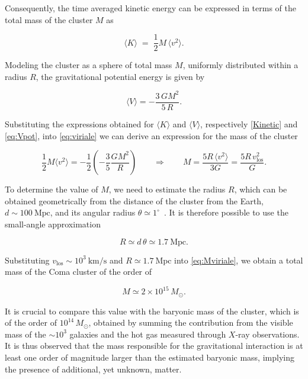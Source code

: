 Consequently, the time averaged kinetic energy can be expressed in terms of the total mass of the cluster $M$ as

\begin{equation} \label{Kinetic}
\langle K\rangle \;=\;\frac{1}{2}M\,\langle v^{2}\rangle.
\end{equation}

Modeling the cluster as a sphere of total mass $M$, uniformly distributed within a radius $R$, the gravitational potential energy is given by

\begin{equation}\label{eq:Vpot}
    \langle V\rangle = -\frac{3\,G M^{2}}{5\,R}.
\end{equation}

Substituting the expressions obtained for $\langle K \rangle$ and $\langle V \rangle$, respectively \cref{Kinetic} and \cref{eq:Vpot}, into \cref{eq:viriale} we can derive an expression for the mass of the cluster

\begin{equation}
\frac{1}{2}M\langle v^{2}\rangle
=
-\frac{1}{2}\!\left(-\frac{3}{5}\frac{GM^{2}}{R}\right)
\qquad\Rightarrow\qquad
M=\frac{5R\,\langle v^{2}\rangle}{3G}
=\frac{5R\,v_{\text{los}}^{2}}{G}.
\label{eq:Mviriale}
\end{equation}

To determine the value of $M$, we need to estimate the radius $R$, which can be obtained geometrically from the distance of the cluster from the Earth, $d \sim 100~\mathrm{Mpc}$, and its angular radius $\theta \simeq 1^\circ$~\cite{Colless1996}.
It is therefore possible to use the small-angle approximation

\begin{equation}
R \simeq d\,\theta \simeq 1.7\ \text{Mpc}.
\end{equation}

Substituting $v_{\mathrm{los}} \sim 10^{3}~\mathrm{km/s}$ and $R \simeq 1.7~\mathrm{Mpc}$ into \cref{eq:Mviriale}, we obtain a total mass of the Coma cluster of the order of

\begin{equation}
M  \simeq 2 \times 10^{15}\,M_{\odot}.
\end{equation}


It is crucial to compare this value with the baryonic mass of the cluster, which is of the order of $10^{14}\,M_{\odot}$, obtained by summing the contribution from the visible mass of the $\sim 10^3$ galaxies and the hot gas measured through $X$-ray observations.
It is thus observed that the mass responsible for the gravitational interaction is at least one order of magnitude larger than the estimated baryonic mass, implying the presence of additional, yet unknown, matter.

